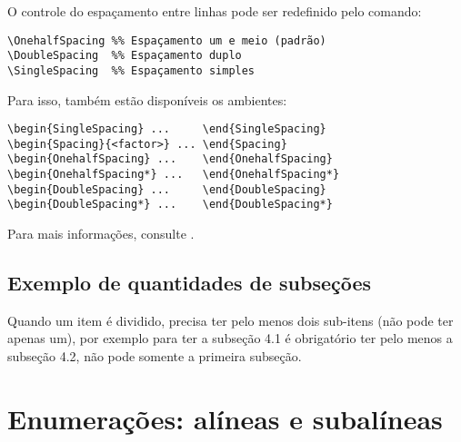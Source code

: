 O controle do espaçamento entre linhas pode ser redefinido pelo comando:

\begin{SingleSpacing}%
\begin{verbatim}
\OnehalfSpacing %% Espaçamento um e meio (padrão)
\DoubleSpacing  %% Espaçamento duplo
\SingleSpacing  %% Espaçamento simples
\end{verbatim}
\end{SingleSpacing}

Para isso, também estão disponíveis os ambientes:

\begin{SingleSpacing}%
\begin{verbatim}
\begin{SingleSpacing} ...     \end{SingleSpacing}
\begin{Spacing}{<factor>} ... \end{Spacing}
\begin{OnehalfSpacing} ...    \end{OnehalfSpacing}
\begin{OnehalfSpacing*} ...   \end{OnehalfSpacing*}
\begin{DoubleSpacing} ...     \end{DoubleSpacing}
\begin{DoubleSpacing*} ...    \end{DoubleSpacing*}
\end{verbatim}
\end{SingleSpacing}

Para mais informações, consulte .

\subsection{Exemplo de quantidades de subseções}\label{sec:exSubsec}

Quando um item é dividido, precisa ter pelo menos dois sub-itens (não pode ter apenas um), por exemplo para ter a subseção 4.1 é obrigatório ter pelo menos a subseção 4.2, não pode somente a primeira subseção.

\section{Enumerações: alíneas e subalíneas}\label{sec:enumeracoes}

